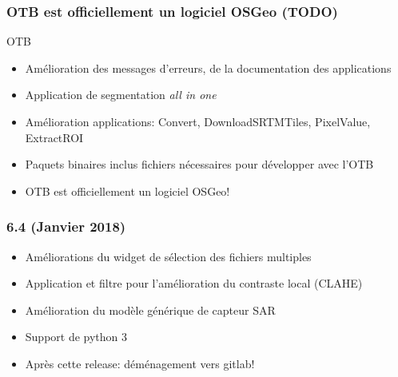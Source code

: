 \documentclass[8pt]{beamer}
\begin{document}
\begin{frame}
  \frametitle{OTB est officiellement un logiciel OSGeo (TODO)}
  \begin{block}{OTB}
    \begin{itemize}
      \item Amélioration des messages d'erreurs, de la documentation des applications
      \item Application de segmentation \textit{all in one}
      \item Amélioration applications: Convert, DownloadSRTMTiles, PixelValue, ExtractROI
      \item Paquets binaires inclus fichiers nécessaires pour développer avec l'OTB
      \item OTB est officiellement un logiciel OSGeo!
    \end{itemize}
    \end{block}
\end{frame}

\begin{frame}
  \frametitle{6.4 (Janvier 2018)}

  \begin{itemize}
  \item Améliorations du widget de sélection des fichiers multiples
  \item Application et filtre pour l'amélioration du contraste local (CLAHE)
  \item Amélioration du modèle générique de capteur SAR
  \item Support de python 3
  \item Après cette release: déménagement vers gitlab!
  \end{itemize}  
\end{frame}

\begin{frame}
\end{frame}
\end{document}
